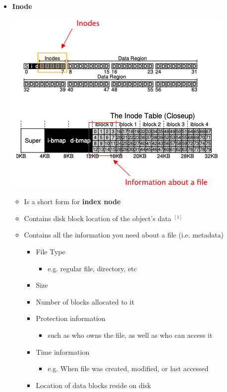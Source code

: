 \documentclass[12pt]{article}
\begin{document}
\begin{itemize}
    \item \textbf{Inode}

    \begin{center}
    \includegraphics[width=\linewidth]{images/midterm_1_solution_12.png}
    \end{center}

    \begin{itemize}
        \item Is a short form for \textbf{index node}
        \item Contains disk block location of the object's data $^{[1]}$
        \item Contains all the information you need about a file (i.e. metadata)

        \begin{itemize}
            \item File Type
            \begin{itemize}
                \item e.g. regular file, directory, etc
            \end{itemize}
            \item Size
            \item Number of blocks allocated to it
            \item Protection information
            \begin{itemize}
                \item such as who owns the file, as well as who can access it
            \end{itemize}
            \item Time information
            \begin{itemize}
                \item e.g. When file was created, modified, or last accessed
            \end{itemize}
            \item Location of data blocks reside on disk
        \end{itemize}
    \end{itemize}


\end{itemize}
\end{document}
